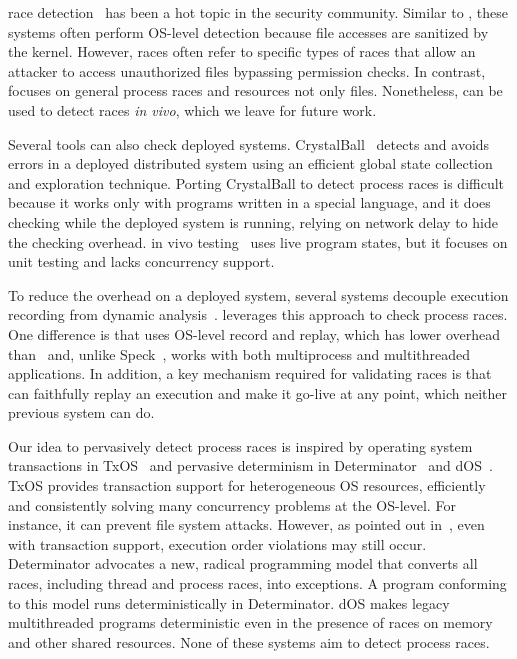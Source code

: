   

 \toctou race
detection~\cite{toctou:fast08,toctou:usec03,toctou:fast05} has been a hot
topic in the security community.  Similar to \racepro, these systems often
perform OS-level detection because file accesses are sanitized by the
kernel.  However, \toctou races often refer to specific types of races that
allow an attacker to access unauthorized files bypassing permission
checks.  In contrast, \racepro focuses on general process races and resources
not only files.  Nonetheless, \racepro can be used to detect \toctou races
\emph{in vivo}, which we leave for future work.

  Several tools can also check deployed
systems.  CrystalBall~\cite{crystalball:nsdi09} detects and avoids errors
in a deployed distributed system using an efficient global state
collection and exploration technique.  Porting CrystalBall to detect
process races is difficult because it works only with programs written in
a special language, and it does checking while the deployed system is
running, relying on network delay to hide the checking overhead.  in vivo
testing~\cite{in-vivo-testing} uses live program states, but it focuses on
unit testing and lacks concurrency support.

To reduce the overhead on a deployed system, several systems decouple
execution recording from dynamic
analysis~\cite{decouple:usenix08,speck:asplos08}.  \racepro leverages this
approach to check process races.  One difference is that \racepro uses
OS-level record and replay, which has lower overhead
than~\cite{decouple:usenix08} and, unlike Speck~\cite{speck:asplos08},
\racepro works with both multiprocess and multithreaded applications. In addition, 
a key mechanism required for validating races is that \racepro can faithfully
replay an execution and make it go-live at any point, 
which neither previous system can do.

  Our idea to
pervasively detect process races is inspired by operating system
transactions in TxOS~\cite{txos:sosp09} and pervasive determinism in
Determinator~\cite{determinator:osdi10} and dOS~\cite{dos:osdi10}.  TxOS
provides transaction support for heterogeneous OS resources, efficiently
and consistently solving many concurrency problems at the OS-level.  For
instance, it can prevent file system \toctou attacks.  However, as pointed
out in~\cite{lu:concurrency-bugs}, even with transaction support,
execution order violations may still occur.  Determinator advocates a
new, radical programming model that converts all races, including thread
and process races, into exceptions.  A program conforming to this model
runs deterministically in Determinator.  dOS makes legacy multithreaded
programs deterministic even in the presence of races on memory and other
shared resources.  None of these systems aim to detect process races.

